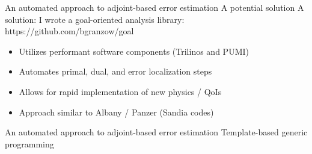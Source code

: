 \documentclass[fleqn]{beamer}
\begin{document}
\begin{frame}{An automated approach to adjoint-based error estimation}
{A potential solution}
A solution: I wrote a goal-oriented analysis library:\\
\vspace{1em}
https://github.com/bgranzow/goal
\vspace{1em}

\begin{itemize}
\item Utilizes performant software components (Trilinos and PUMI)
\item Automates primal, dual, and error localization steps
\item Allows for rapid implementation of new physics / QoIs
\item Approach similar to Albany / Panzer (Sandia codes)
\end{itemize}
\end{frame}


\begin{frame}{An automated approach to adjoint-based error estimation}
{Template-based generic programming}
\begin{center}

\end{center}
\end{frame}

\end{document}
